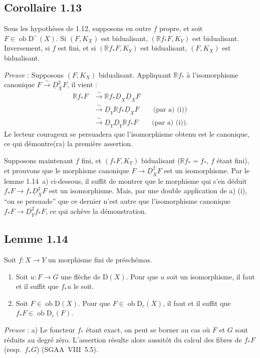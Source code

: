 \documentclass[11pt]{article}
\newcommand{\R}{\mathbb{R}}\newcommand{\RHomCore}{\mathbb{R}\mathrm{Hom}}
\newcommand{\D}{\mathrm{D}}
\newcommand{\ob}{\operatorname{ob}}
\providecommand{\ob}{\operatorname{ob}}
\providecommand{\R}{\mathrm R}
\begin{document}
\subsection*{Corollaire 1.13}
Sous les hypothèses de 1.12, supposons en outre $f$ propre, et soit $F \in \ob \D^{-}(X)$. Si $(F, K_X)$ est bidualisant, $(\R f_{*}F, K_Y)$ est bidualisant. Inversement, si $f$ est fini, et si $(\R f_{*}F, K_Y)$ est bidualisant, $(F, K_X)$ est bidualisant.

\emph{Preuve} : Supposons $(F, K_X)$ bidualisant. Appliquant $\R f_{*}$ à l'isomorphisme canonique $F \xrightarrow{\sim} \underline{D}_X^{2} F$, il vient :
\begin{align*}
\R f_{*} F &\xrightarrow{\sim} \R f_{*} \underline{D}_X \underline{D}_X F \\
&\xrightarrow{\sim} \underline{D}_Y \R f_{*} \underline{D}_X F \qquad \text{(par a) (i))} \\
&\xrightarrow{\sim} \underline{D}_Y \underline{D}_Y \R f_{*} F \qquad \text{(par a) (i)).}
\end{align*}
Le lecteur courageux se persuadera que l'isomorphisme obtenu est le canonique, ce qui démontre(ra) la première assertion.

Supposons maintenant $f$ fini, et $(f_{*}F, K_Y)$ bidualisant ($\R f_{*} = f_{*}$, $f$ étant fini), et prouvons que le morphisme canonique $F \to \underline{D}_X^{2} F$ est un isomorphisme. Par le lemme 1.14~a) ci-dessous, il suffit de montrer que le morphisme qui s'en déduit $f_{*}F \to f_{*}\underline{D}_X^{2} F$ est un isomorphisme. Mais, par une double application de a) (i), ``on se persuade'' que ce dernier n'est autre que l'isomorphisme canonique $f_{*}F \to \underline{D}_Y^{2} f_{*}F$, ce qui achève la démonstration.

\subsection*{Lemme 1.14}
Soit $f : X \to Y$ un morphisme fini de préschémas.
\begin{enumerate}
\item[a)] Soit $u : F \to G$ une flèche de $\D(X)$. Pour que $u$ soit un isomorphisme, il faut et il suffit que $f_{*}u$ le soit.
\item[b)]
Soit $F \in \ob \D(X)$. Pour que $F \in \ob \D_c(X)$, il faut et il suffit que $f_{*}F \in \ob \D_c(F)$.
\end{enumerate}

\emph{Preuve} : a) Le foncteur $f_{*}$ étant exact, on peut se borner au cas où $F$ et $G$ sont réduits au degré zéro. L'assertion résulte alors aussitôt du calcul des fibres de $f_{*}F$ (resp.~$f_{*}G$) (SGAA~VIII~5.5).
\end{document}
